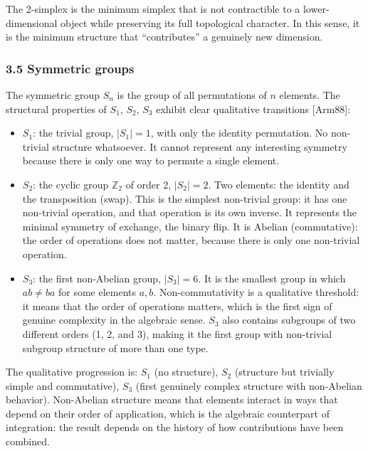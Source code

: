 \documentclass[
  11pt,
  letterpaper,
]{article}
\begin{document}
The 2-simplex is the minimum simplex that is not contractible to a
lower-dimensional object while preserving its full topological
character. In this sense, it is the minimum structure that
``contributes'' a genuinely new dimension.

\subsubsection{3.5 Symmetric groups}\label{symmetric-groups}

The symmetric group \(S_n\) is the group of all permutations of \(n\)
elements. The structural properties of \(S_1\), \(S_2\), \(S_3\) exhibit
clear qualitative transitions {[}Arm88{]}:

\begin{itemize}
\item
  \(S_1\): the trivial group, \(|S_1| = 1\), with only the identity
  permutation. No non-trivial structure whatsoever. It cannot represent
  any interesting symmetry because there is only one way to permute a
  single element.
\item
  \(S_2\): the cyclic group \(\mathbb{Z}_2\) of order 2, \(|S_2| = 2\).
  Two elements: the identity and the transposition (swap). This is the
  simplest non-trivial group: it has one non-trivial operation, and that
  operation is its own inverse. It represents the minimal symmetry of
  exchange, the binary flip. It is Abelian (commutative): the order of
  operations does not matter, because there is only one non-trivial
  operation.
\item
  \(S_3\): the first non-Abelian group, \(|S_3| = 6\). It is the
  smallest group in which \(ab \neq ba\) for some elements \(a, b\).
  Non-commutativity is a qualitative threshold: it means that the order
  of operations matters, which is the first sign of genuine complexity
  in the algebraic sense. \(S_3\) also contains subgroups of two
  different orders (1, 2, and 3), making it the first group with
  non-trivial subgroup structure of more than one type.
\end{itemize}

The qualitative progression is: \(S_1\) (no structure), \(S_2\)
(structure but trivially simple and commutative), \(S_3\) (first
genuinely complex structure with non-Abelian behavior). Non-Abelian
structure means that elements interact in ways that depend on their
order of application, which is the algebraic counterpart of integration:
the result depends on the history of how contributions have been
combined.
\end{document}
